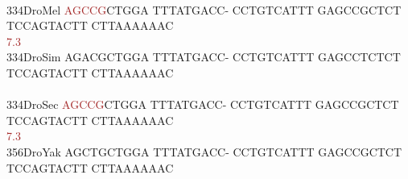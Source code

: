 \documentclass[11pt,twoside,reqno,a4paper]{article}
\begin{document}
{\\
334\hspace*{1\charwidth}DroMel	\textcolor{Brown}{A}\textcolor{Brown}{G}\textcolor{Brown}{C}\textcolor{Brown}{C}\textcolor{Brown}{G}CTGGA	TTTATGACC-	CCTGTCATTT	GAGCCGCTCT	TCCAGTACTT	CTTAAAAAAC	\\
\hspace*{4\charwidth}\hspace*{7\charwidth}\hspace*{0\charwidth}\textcolor{Brown}{7.3}\hspace*{1\charwidth}\hspace*{1\charwidth}\hspace*{1\charwidth}\hspace*{1\charwidth}\hspace*{1\charwidth}\hspace*{1\charwidth}\\
334\hspace*{1\charwidth}DroSim	AGACGCTGGA	TTTATGACC-	CCTGTCATTT	GAGCCTCTCT	TCCAGTACTT	CTTAAAAAAC	\\
\hspace*{4\charwidth}\hspace*{7\charwidth}\hspace*{1\charwidth}\hspace*{1\charwidth}\hspace*{1\charwidth}\hspace*{1\charwidth}\hspace*{1\charwidth}\hspace*{1\charwidth}\\
334\hspace*{1\charwidth}DroSec	\textcolor{Brown}{A}\textcolor{Brown}{G}\textcolor{Brown}{C}\textcolor{Brown}{C}\textcolor{Brown}{G}CTGGA	TTTATGACC-	CCTGTCATTT	GAGCCGCTCT	TCCAGTACTT	CTTAAAAAAC	\\
\hspace*{4\charwidth}\hspace*{7\charwidth}\hspace*{0\charwidth}\textcolor{Brown}{7.3}\hspace*{1\charwidth}\hspace*{1\charwidth}\hspace*{1\charwidth}\hspace*{1\charwidth}\hspace*{1\charwidth}\hspace*{1\charwidth}\\
356\hspace*{1\charwidth}DroYak	AGCTGCTGGA	TTTATGACC-	CCTGTCATTT	GAGCCGCTCT	TCCAGTACTT	CTTAAAAAAC	\\
}
\end{document}
